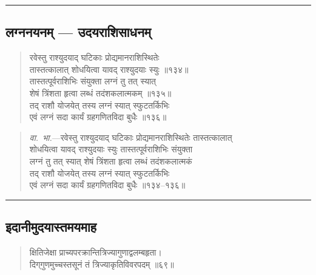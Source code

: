 \documentclass[11pt,a4paper]{article}
\newcommand{\longline}{\noindent\rule{\textwidth}{0.4pt}}
\newcommand{\dev}[1]{{\devanagarifont #1}}
\newenvironment{shloka}{%
  \begin{quote}
  \small
  \setlength{\leftmargin}{2em}
  \devanagarifont
}{\end{quote}}
\newenvironment{vyakhya}{%
  \begin{quote}
  \small
  \setlength{\leftmargin}{1em}
  \devanagarifont
}{\end{quote}}
\newcommand{\skt}[1]{{\devanagarifont #1}}
\begin{document}
\longline

\subsection{\dev{लग्ननयनम् — उदयराशिसाधनम्}}

\begin{shloka}
\skt{रवेस्तु राश्युदयाद् घटिकाः प्रोद्यमानराशिस्थितेः}\\[0.3em]
\skt{तास्तत्कालात् शोधयित्वा यावद् राश्युदयाः स्युः ॥१३४॥}\\[0.3em]
\skt{तास्तत्पूर्वराशिभिः संयुक्ता लग्नं तु तत् स्यात्}\\[0.3em]
\skt{शेषं त्रिंशता हृत्वा लब्धं तदंशकलात्मकम् ॥१३५॥}\\[0.3em]
\skt{तद् राशौ योजयेत् तस्य लग्नं स्यात् स्फुटतर्किभिः}\\[0.3em]
\skt{एवं लग्नं सदा कार्यं ग्रहगणितविदा बुधैः ॥१३६॥}
\end{shloka}

\begin{vyakhya}
\textit{वा.~भा.}—\skt{रवेस्तु राश्युदयाद् घटिकाः प्रोद्यमानराशिस्थितेः तास्तत्कालात्}\\
\skt{शोधयित्वा यावद् राश्युदयाः स्युः तास्तत्पूर्वराशिभिः संयुक्ता}\\
\skt{लग्नं तु तत् स्यात् शेषं त्रिंशता हृत्वा लब्धं तदंशकलात्मकं}\\
\skt{तद् राशौ योजयेत् तस्य लग्नं स्यात् स्फुटतर्किभिः}\\
\skt{एवं लग्नं सदा कार्यं ग्रहगणितविदा बुधैः ॥१३४--१३६॥}
\end{vyakhya}

\longline

\subsection{\dev{इदानीमुदयास्तमयमाह}}

\begin{shloka}
\skt{क्षितिजेक्षा प्राच्यपरक्रान्तित्रिज्यागुणाद्वलम्बहृता।}\\
\skt{दिग्‌गुणमुच्चस्तसूनं तं त्रिज्याकृतिविवरपदम् ॥६९॥}
\end{shloka}
\end{document}
